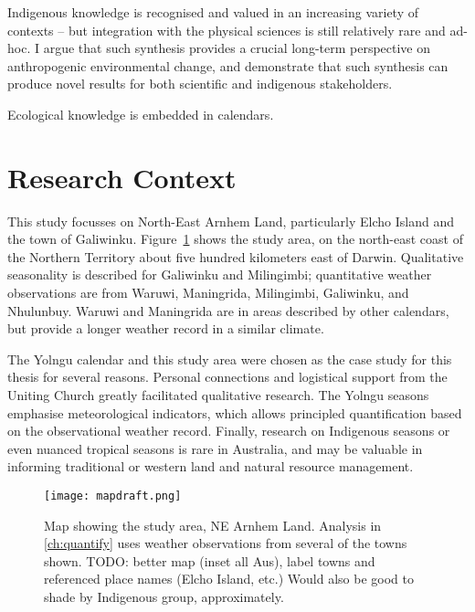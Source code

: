 Indigenous knowledge is recognised and valued in an increasing variety
of contexts \citep[eg.][]{petheram2010,cochran2015,berkes2012} –
but integration with the physical sciences is still relatively rare and ad-hoc.
%
I argue that such synthesis provides a crucial long-term perspective on
anthropogenic environmental change, and demonstrate that such synthesis
can produce novel results for both scientific and indigenous stakeholders.

Ecological knowledge is embedded in calendars.




\section{Research Context}
\label{sec:context}

This study focusses on North-East Arnhem Land, particularly Elcho Island
and the town of Galiwinku.  Figure~\ref{fig:arnhem-map} shows the study
area, on the north-east coast of the Northern Territory about five hundred
kilometers east of Darwin.
%
Qualitative seasonality is described for Galiwinku and Milingimbi;
quantitative weather observations are from Waruwi, Maningrida, Milingimbi,
Galiwinku, and Nhulunbuy.  Waruwi and Maningrida are in areas described by
other calendars, but provide a longer weather record in a similar climate.

The Yolngu calendar and this study area were chosen as the case study for
this thesis for several reasons.  Personal connections and logistical support
from the Uniting Church greatly facilitated qualitative research.  The
Yolngu seasons emphasise meteorological indicators, which allows principled
quantification based on the observational weather record.  Finally, research
on Indigenous seasons or even nuanced tropical seasons is rare in Australia,
and may be valuable in informing traditional or western land and natural
resource management.


\begin{figure}[h]
    \centering
    \texttt{[image: mapdraft.png]}
    \caption[Map showing the study area, NE Arnhem Land]{
        Map showing the study area, NE Arnhem Land.
        Analysis in \autoref{ch:quantify} uses weather observations from several of the towns shown.
        TODO:  better map (inset all Aus), label towns and referenced place names
        (Elcho Island, etc.)
        Would also be good to shade by Indigenous group, approximately.
        }
    \label{fig:arnhem-map}
\end{figure}


